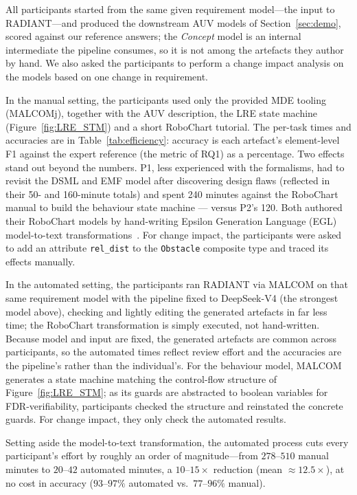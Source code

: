 All participants started from the same given requirement model---the input to RADIANT---and produced the downstream AUV models of Section~\ref{sec:demo}, scored against our reference answers; the \textit{Concept} model is an internal intermediate the pipeline consumes, so it is not among the artefacts they author by hand.
We also asked the participants to perform a change impact analysis on the models based on one change in requirement.

In the manual setting, the participants used only the provided MDE tooling (MALCOMj), together with the AUV description, the LRE state machine (Figure~\ref{fig:LRE_STM}) and a short RoboChart tutorial.
The per-task times and accuracies are in Table~\ref{tab:efficiency}: accuracy is each artefact's element-level F1 against the expert reference (the metric of RQ1) as a percentage. 
Two effects stand out beyond the numbers.
P1, less experienced with the formalisms, had to revisit the DSML and EMF model after discovering design flaws (reflected in their 50- and 160-minute totals) and spent 240 minutes against the RoboChart manual to build the behaviour state machine --- versus P2's 120. 
Both authored their RoboChart models by hand-writing Epsilon Generation Language (EGL) model-to-text transformations~\cite{rose2008epsilon}.
For change impact, the participants were asked to add an attribute \texttt{rel\_dist} to the \texttt{Obstacle} composite type and traced its effects manually.

In the automated setting, the participants ran RADIANT via MALCOM on that same requirement model with the pipeline fixed to DeepSeek-V4 (the strongest model above), checking and lightly editing the generated artefacts in far less time; the RoboChart transformation is simply executed, not hand-written.
Because model and input are fixed, the generated artefacts are common across participants, so the automated times reflect review effort and the accuracies are the pipeline's rather than the individual's.
For the behaviour model, MALCOM generates a state machine matching the control-flow structure of Figure~\ref{fig:LRE_STM}; as its guards are abstracted to boolean variables for FDR-verifiability, participants checked the structure and reinstated the concrete guards.
For change impact, they only check the automated results.

Setting aside the model-to-text transformation, the automated process cuts every participant's effort by roughly an order of magnitude---from $278$--$510$ manual minutes to $20$--$42$ automated minutes, a $10$--$15\times$ reduction (mean ${\approx}12.5\times$), at no cost in accuracy ($93$--$97\%$ automated vs.\ $77$--$96\%$ manual).


